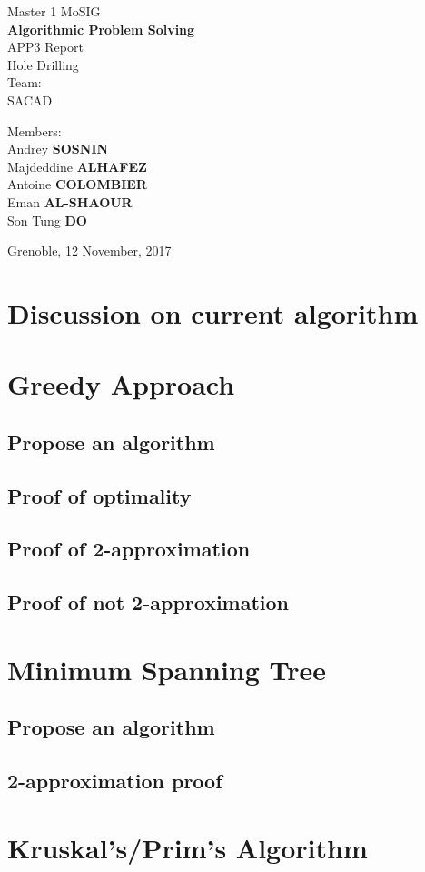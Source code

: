 \documentclass{article}
\begin{document}
\begin{titlepage}
\begin{center}

\vspace*{10cm}
{\large Master 1 MoSIG}\\[0.5cm]

{\Huge \textbf{Algorithmic Problem Solving} }\\[0.5cm]
{\large APP3 Report}\\
Hole Drilling\\ 
Team:\\SACAD
\vfill

\noindent
\begin{minipage}{0.4\textwidth}
   \centering Members:\\
   Andrey \textbf{SOSNIN}\\
   Majdeddine \textbf{ALHAFEZ}\\
   Antoine \textbf{COLOMBIER}\\
   Eman \textbf{AL-SHAOUR}\\
   Son Tung \textbf{DO}\\
\end{minipage}%

\vfill
{Grenoble, 12 November, 2017}
\end{center}
\end{titlepage}
\clearpage

\section{Discussion on current algorithm}

\section{Greedy Approach}
\subsection{Propose an algorithm}
\subsection{Proof of optimality}
\subsection{Proof of 2-approximation}
\subsection{Proof of not 2-approximation}

\section{Minimum Spanning Tree}
\subsection{Propose an algorithm}
\subsection{2-approximation proof}

\section{Kruskal's/Prim's Algorithm}
\end{document}
